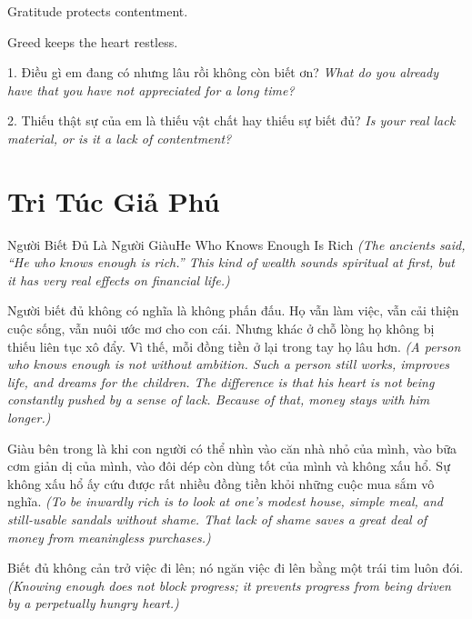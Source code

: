 \begin{ghinhoanh}
Gratitude protects contentment.

Greed keeps the heart restless.
\end{ghinhoanh}

\begin{tuhocnhanh}
1. Điều gì em đang có nhưng lâu rồi không còn biết ơn? \textit{What do you already have that you have not appreciated for a long time?}

2. Thiếu thật sự của em là thiếu vật chất hay thiếu sự biết đủ? \textit{Is your real lack material, or is it a lack of contentment?}
\end{tuhocnhanh}
\ngancach

\section{Tri Túc Giả Phú}
\begin{truyen}{Người Biết Đủ Là Người Giàu}{He Who Knows Enough Is Rich}
\textit{(The ancients said, ``He who knows enough is rich.'' This kind of wealth sounds spiritual at first, but it has very real effects on financial life.)}

Người biết đủ không có nghĩa là không phấn đấu. Họ vẫn làm việc, vẫn cải thiện cuộc sống, vẫn nuôi ước mơ cho con cái. Nhưng khác ở chỗ lòng họ không bị thiếu liên tục xô đẩy. Vì thế, mỗi đồng tiền ở lại trong tay họ lâu hơn.
\textit{(A person who knows enough is not without ambition. Such a person still works, improves life, and dreams for the children. The difference is that his heart is not being constantly pushed by a sense of lack. Because of that, money stays with him longer.)}

Giàu bên trong là khi con người có thể nhìn vào căn nhà nhỏ của mình, vào bữa cơm giản dị của mình, vào đôi dép còn dùng tốt của mình và không xấu hổ. Sự không xấu hổ ấy cứu được rất nhiều đồng tiền khỏi những cuộc mua sắm vô nghĩa.
\textit{(To be inwardly rich is to look at one’s modest house, simple meal, and still-usable sandals without shame. That lack of shame saves a great deal of money from meaningless purchases.)}
\end{truyen}

\begin{baihoc}
Biết đủ không cản trở việc đi lên; nó ngăn việc đi lên bằng một trái tim luôn đói.
\textit{(Knowing enough does not block progress; it prevents progress from being driven by a perpetually hungry heart.)}
\end{baihoc}

